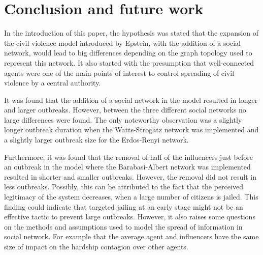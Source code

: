 \documentclass[10pt]{article}
\begin{document}
    \newpage

    \section*{Conclusion and future work}
    In the introduction of this paper, the hypothesis was stated that the expansion of the civil violence model introduced by Epstein, with the addition of a social network, would lead to big differences depending on the graph topology used to represent this network. It also started with the presumption that well-connected agents were one of the main points of interest to control spreading of civil violence by a central authority.

    It was found that the addition of a social network in the model resulted in longer and larger outbreaks. However, between the three different social networks no large differences were found. The only noteworthy observation was a slightly longer outbreak duration when the Watts-Strogatz network was implemented and a slightly larger outbreak size for the Erdos-Renyi network.

    Furthermore, it was found that the removal of half of the influencers just before an outbreak in the model where the Barabasi-Albert network was implemented resulted in shorter and smaller outbreaks. However, the removal did not result in less outbreaks. Possibly, this can be attributed to the fact that the perceived legitimacy of the system decreases, when a large number of citizens is jailed. This finding could indicate that targeted jailing at an early stage might not be an effective tactic to prevent large outbreaks. However, it also raises some questions on the methods and assumptions used to model the spread of information in social network. For example that the average agent and influencers have the same size of impact on the hardship contagion over other agents.

\end{document}
